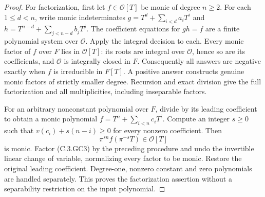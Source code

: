 \begin{proof}
For factorization, first let $f\in\mathcal O[T]$ be monic of degree
$n\ge2$.  For each $1\le d<n$, write monic indeterminates
$g=T^d+\sum_{i<d}a_iT^i$ and
$h=T^{n-d}+\sum_{j<n-d}b_jT^j$.
The coefficient equations for $gh=f$ are a finite polynomial
system over $\mathcal O$.  Apply the integral decision to each.
Every monic factor of $f$ over $F$ lies in $\mathcal O[T]$:
its roots are integral over $\mathcal O$, hence so are its
coefficients, and $\mathcal O$ is integrally closed in $F$.
Consequently all answers are negative exactly when $f$ is
irreducible in $F[T]$.  A positive answer constructs genuine monic
factors of strictly smaller degree.  Recursion and exact division
give the full factorization and all multiplicities, including
inseparable factors.

For an arbitrary nonconstant polynomial over $F$, divide by its
leading coefficient to obtain a monic polynomial
$f=T^n+\sum_{i<n}c_iT^i$.  Compute an integer $s\ge0$ such that
$v(c_i)+s(n-i)\ge0$ for every nonzero coefficient.
Then
\[
                    \pi^{sn}f(\pi^{-s}T)\in\mathcal O[T]
                                                               \tag{C.3.GC3}
\]
is monic.  Factor (C.3.GC3) by the preceding procedure and undo
the invertible linear change of variable, normalizing every factor
to be monic.  Restore the original leading coefficient.
Degree-one, nonzero constant and zero polynomials are handled
separately.  This proves the factorization assertion without a
separability restriction on the input polynomial.
\end{proof}

